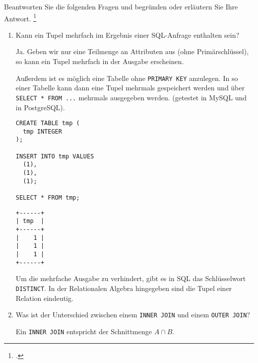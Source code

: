 \documentclass{bschlangaul-aufgabe}
\begin{document}

Beantworten Sie die folgenden Fragen und begründen oder erläutern Sie
Ihre Antwort.
\footcite{examen:66116:2021:03}

\begin{enumerate}


\item Kann ein Tupel mehrfach im Ergebnis einer SQL-Anfrage enthalten
sein?

\begin{bAntwort}
Ja. Geben wir nur eine Teilmenge an Attributen aus (\zB ohne
Primärschlüssel), so kann ein Tupel mehrfach in
der Ausgabe erscheinen.

Außerdem ist es möglich eine Tabelle ohne \texttt{PRIMARY KEY}
anzulegen. In so einer Tabelle kann dann eine Tupel mehrmals gespeichert
werden und über \texttt{SELECT * FROM ...} mehrmals ausgegeben werden.
(getestet in MySQL und in PostgreSQL).

\begin{verbatim}
CREATE TABLE tmp (
  tmp INTEGER
);

INSERT INTO tmp VALUES
  (1),
  (1),
  (1);

SELECT * FROM tmp;
\end{verbatim}

\begin{verbatim}
+------+
| tmp  |
+------+
|    1 |
|    1 |
|    1 |
+------+
\end{verbatim}

Um die mehrfache Ausgabe zu verhindert, gibt es in SQL das
Schlüsselwort \texttt{DISTINCT}. In der Relationalen Algebra hingegeben
sind die Tupel einer Relation eindeutig.
\end{bAntwort}


\item Was ist der Unterschied zwischen einem \texttt{INNER JOIN} und
einem \texttt{OUTER JOIN}?

\begin{bAntwort}
Ein \texttt{INNER JOIN} entspricht der Schnittmenge $A \cap B$.


\end{bAntwort}
\end{enumerate}
\end{document}
